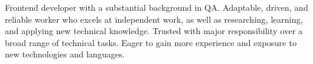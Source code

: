 

\begin{cvparagraph}

Frontend developer with a substantial background in QA. Adaptable, driven, and reliable worker who excels at independent work, as well as researching, learning, and applying new technical knowledge. Trusted with major responsibility over a broad range of technical tasks. Eager to gain more experience and exposure to new technologies and languages.
\end{cvparagraph}
